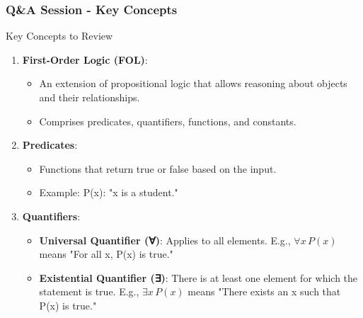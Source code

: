 \documentclass[aspectratio=169]{beamer}
\begin{document}
\begin{frame}[fragile]
  \frametitle{Q\&A Session - Key Concepts}
  \begin{block}{Key Concepts to Review}
    \begin{enumerate}
      \item \textbf{First-Order Logic (FOL)}:
        \begin{itemize}
          \item An extension of propositional logic that allows reasoning about objects and their relationships.
          \item Comprises predicates, quantifiers, functions, and constants.
        \end{itemize}
      \item \textbf{Predicates}:
        \begin{itemize}
          \item Functions that return true or false based on the input. 
          \item Example: P(x): "x is a student."
        \end{itemize}
      \item \textbf{Quantifiers}:
        \begin{itemize}
          \item \textbf{Universal Quantifier (∀)}: Applies to all elements. E.g., $\forall x \, P(x)$ means "For all x, P(x) is true."
          \item \textbf{Existential Quantifier (∃)}: There is at least one element for which the statement is true. E.g., $\exists x \, P(x)$ means "There exists an x such that P(x) is true."
        \end{itemize}
    \end{enumerate}
  \end{block}
\end{frame}
\end{document}
